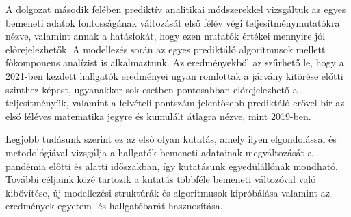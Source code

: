 \documentclass[12pt]{article}
\begin{document}
A dolgozat második felében prediktív analitikai módszerekkel vizsgáltuk az egyes bemeneti adatok fontosságának változását első félév végi teljesítménymutatókra nézve, valamint annak a hatásfokát, hogy ezen mutatók értékei mennyire jól előrejelezhetők. A modellezés során az egyes prediktáló algoritmusok mellett főkomponens analízist is alkalmaztunk. Az eredményekből az szűrhető le, hogy a 2021-ben kezdett hallgatók eredményei ugyan romlottak a járvány kitörése előtti szinthez képest, ugyanakkor sok esetben pontosabban előrejelezhető a teljesítményük, valamint a felvételi pontszám jelentősebb prediktáló erővel bír az első féléves matematika jegyre és kumulált átlagra nézve, mint 2019-ben.

Legjobb tudásunk szerint ez az első olyan kutatás, amely ilyen elgondolással és metodológiával vizsgálja a hallgatók bemeneti adatainak megváltozását a pandémia előtti és alatti időszakban, így kutatásunk egyedülállónak mondható. További céljaink közé tartozik a kutatás többféle bemeneti változóval való kibővítése, új modellezési struktúrák és algoritmusok kipróbálása valamint az eredmények egyetem- és hallgatóbarát hasznosítása. 
\end{document}
